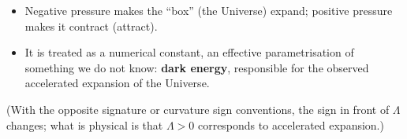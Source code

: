\begin{enumerate}[label=(\roman*)]
\begin{itemize}[nosep]
\item Negative pressure makes the ``box'' (the Universe) expand; positive pressure makes it contract (attract).
\item It is treated as a numerical constant, an effective parametrisation of something we do not know: \textbf{dark energy}, responsible for the observed accelerated expansion of the Universe.
\end{itemize}
(With the opposite signature or curvature sign conventions, the sign in front of $\Lambda$ changes; what is physical is that $\Lambda>0$ corresponds to accelerated expansion.)
\end{enumerate}
